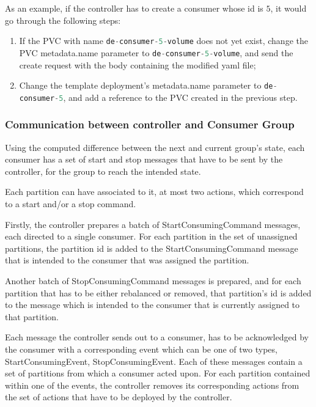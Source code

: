 As an example, if the controller has to create a consumer whose id is $5$, it
would go through the following steps: \begin{enumerate} \item If the PVC with
            name \lstinline[language=Python]{de-consumer-5-volume} does not yet
            exist, change the PVC metadata.name parameter to
            \lstinline[language=Python]{de-consumer-5-volume}, and send the
            create request with the body containing the modified yaml file;
        \item Change the template deployment's metadata.name parameter to
            \lstinline[language=Python]{de-consumer-5}, and add a reference to
            the PVC created in the previous step.  \end{enumerate}

\subsubsection{Communication between controller and Consumer Group}
\label{sub:controller_communication_cosumer}

Using the computed difference between the next and current group's state, each
consumer has a set of start and stop messages that have to be sent by the
controller, for the group to reach the intended state.

Each partition can have associated to it, at most two actions, which correspond
to a start and/or a stop command. 

Firstly, the controller prepares a batch of StartConsumingCommand messages, each
directed to a single consumer. For each partition in the set of unassigned
partitions, the partition id is added to the StartConsumingCommand message that
is intended to the consumer that was assigned the partition.

Another batch of StopConsumingCommand messages is prepared, and for each
partition that has to be either rebalanced or removed, that partition's id is
added to the message which is intended to the consumer that is currently
assigned to that partition. 

Each message the controller sends out to a consumer, has to be acknowledged by
the consumer with a corresponding event which can be one of two types,
StartConsumingEvent, StopConsumingEvent. Each of these messages contain a set of
partitions from which a consumer acted upon. For each partition contained within
one of the events, the controller removes its corresponding actions from the set
of actions that have to be deployed by the controller. 


